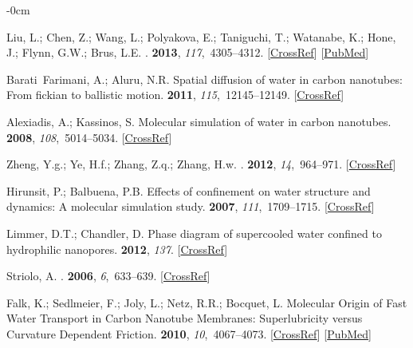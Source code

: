 \documentclass[molecules,article,accept,pdftex,moreauthors]{Definitions/mdpi}
\begin{document}
\begin{adjustwidth}{-\extralength}{0cm}
\begin{thebibliography}{999}
Liu, L.; Chen, Z.; Wang, L.; Polyakova, E.; Taniguchi, T.; Watanabe, K.; Hone,
J.; Flynn, G.W.; Brus, L.E.
.
 {\bf 2013}, {\em 117},~4305--4312. [\href{http://dx.doi.org/10.1021/jp305521g}{CrossRef}] [\href{http://www.ncbi.nlm.nih.gov/pubmed/23121443}{PubMed}]

Barati~Farimani, A.; Aluru, N.R.
\newblock Spatial diffusion of water in carbon nanotubes: From fickian to
ballistic motion.
 {\bf 2011}, {\em 115},~12145--12149. [\href{http://dx.doi.org/10.1021/jp205877b}{CrossRef}]

Alexiadis, A.; Kassinos, S.
\newblock Molecular simulation of water in carbon nanotubes.
 {\bf 2008}, {\em 108},~5014--5034. [\href{http://dx.doi.org/10.1021/cr078140f}{CrossRef}]

Zheng, Y.g.; Ye, H.f.; Zhang, Z.q.; Zhang, H.w.
.
 {\bf 2012}, {\em 14},~964--971. [\href{http://dx.doi.org/10.1039/C1CP22622C}{CrossRef}]

Hirunsit, P.; Balbuena, P.B.
\newblock Effects of confinement on water structure and dynamics: A molecular
simulation study.
 {\bf 2007}, {\em 111},~1709--1715. [\href{http://dx.doi.org/10.1021/jp063718v}{CrossRef}]

Limmer, D.T.; Chandler, D.
\newblock Phase diagram of supercooled water confined to hydrophilic nanopores.
 {\bf 2012}, {\em 137}. [\href{http://dx.doi.org/10.1063/1.4737907}{CrossRef}]

Striolo, A.
.
 {\bf 2006}, {\em 6},~633--639. [\href{http://dx.doi.org/10.1021/nl052254u}{CrossRef}]

Falk, K.; Sedlmeier, F.; Joly, L.; Netz, R.R.; Bocquet, L.
\newblock Molecular Origin of Fast Water Transport in Carbon Nanotube
Membranes: Superlubricity versus Curvature Dependent Friction.
 {\bf 2010}, {\em 10},~4067--4073. [\href{http://dx.doi.org/10.1021/nl1021046}{CrossRef}] [\href{http://www.ncbi.nlm.nih.gov/pubmed/20845964}{PubMed}]


\end{thebibliography}
\end{adjustwidth}
\end{document}
